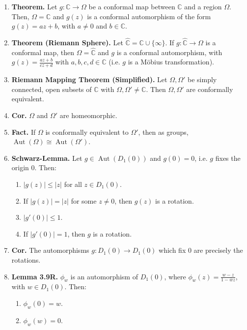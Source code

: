 \documentclass[12pt]{article}
\theoremstyle{definition}
\theoremstyle{named}
\DeclareMathOperator{\Aut}{Aut}
\DeclareMathOperator{\id}{id}
\begin{document}
{\begin{multicols}{2}
\begin{spacing}{1.01}
\begin{enumerate}
\begin{enumerate}
        \item There is an identity map $\id \in \Aut(\Omega)$ such that $\id \circ g(z) = g(z) = g \circ \id(z) = g(z)$. 
    \end{enumerate}
    \item \textbf{Theorem. } Let $g: \mathbb{C} \to \Omega$ be a conformal map between $\mathbb{C}$ and a region $\Omega$. Then, $\Omega = \mathbb{C}$ and $g(z)$ is a conformal automorphism of the form $g(z) = az+b$, with $a \neq 0$ and $b \in \mathbb{C}$. 
    \item \textbf{Theorem (Riemann Sphere). } Let $\hat{\mathbb{C}} = \mathbb{C} \cup \{\infty\}$. If $g: \hat{\mathbb{C}} \to \Omega$ is a conformal map, then $\Omega = \hat{\mathbb{C}}$ and $g$ is a conformal automorphism, with $g(z) = \frac{az+b}{cz+d}$ with $a,b,c,d \in \mathbb{C}$ (i.e. $g$ is a Möbius transformation). 
    \item \textbf{Riemann Mapping Theorem (Simplified). } Let $\Omega,\Omega'$ be simply connected, open subsets of $\mathbb{C}$ with $\Omega,\Omega' \neq \mathbb{C}$. Then $\Omega,\Omega'$ are conformally equivalent. 
    \item \textbf{Cor. } $\Omega$ and $\Omega'$ are homeomorphic. 
    \item \textbf{Fact. } If $\Omega$ is conformally equivalent to $\Omega'$, then as groups, $\Aut(\Omega) \cong \Aut(\Omega')$. 
    \item \textbf{Schwarz-Lemma. } Let $g \in \Aut(D_1(0))$ and $g(0)=0$, i.e. $g$ fixes the origin 0. Then: 
    \begin{enumerate}
        \item $|g(z)| \leq |z|$ for all $z \in D_1(0)$. 
        \item If $|g(z)| = |z|$ for some $z \neq 0$, then $g(z)$ is a rotation. 
        \item $|g'(0)| \leq 1$. 
        \item If $|g'(0)| = 1$, then $g$ is a rotation. 
    \end{enumerate}
    \item \textbf{Cor. } The automorphisms $g: D_1(0) \to D_1(0)$ which fix 0 are precisely the rotations. 
    \item \textbf{Lemma 3.9R. } $\phi_w$ is an automorphism of $D_1(0)$, where $\phi_w(z) = \frac{w-z}{1-\overline{w}z}$, with $w \in D_1(0)$. Then: 
    \begin{enumerate}
        \item $\phi_w(0) = w$. 
        \item $\phi_w(w) = 0$. 

\end{enumerate}
\end{enumerate}
\end{spacing}
\end{multicols}}
\end{document}
